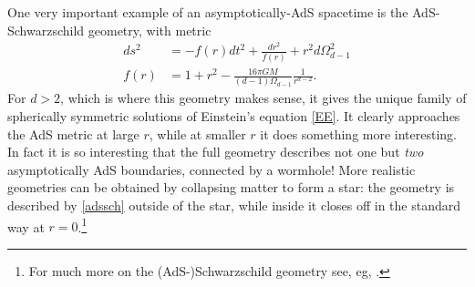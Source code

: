 \documentclass[toc]{PoS}
\begin{document}
One very important example of an asymptotically-AdS spacetime is the AdS-Schwarzschild geometry, with metric
\begin{align}\nonumber
ds^2&=-f(r)dt^2+\frac{dr^2}{f(r)}+r^2 d\Omega_{d-1}^2\\
f(r)&=1+r^2-\frac{16\pi G M}{(d-1)\Omega_{d-1}}\frac{1}{r^{d-2}}.\label{adssch}
\end{align}
For $d>2$, which is where this geometry makes sense, it gives the unique family of spherically symmetric solutions of Einstein's equation \eqref{EE}.  It clearly approaches the AdS metric at large $r$, while at smaller $r$ it does something more interesting.  In fact it is so interesting that the full geometry describes not one but \textit{two} asymptotically AdS boundaries, connected by a wormhole!  More realistic geometries can be obtained by collapsing matter to form a star: the geometry is described by \eqref{adssch} outside of the star, while inside it closes off in the standard way at $r=0$.\footnote{For much more on the (AdS-)Schwarzschild geometry see, eg, \cite{Harlow:2014yka}.}
\end{document}
